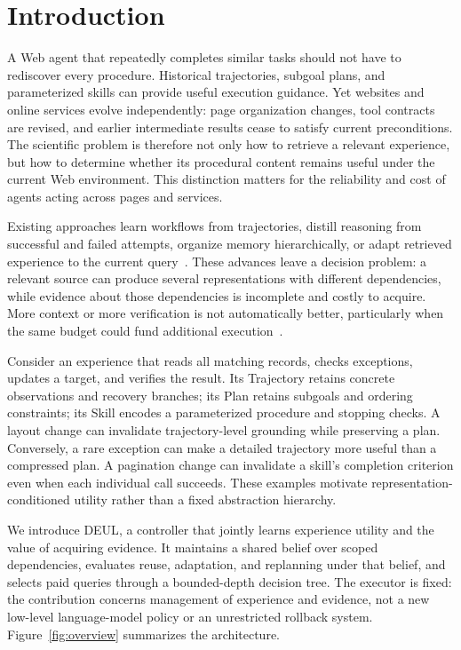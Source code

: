 \documentclass[sigconf,anonymous,review]{acmart}
\newcommand{\DEUL}{\textsc{DEUL}}
\theoremstyle{zhplain}
\begin{document}
\section{Introduction}
\label{sec:intro}
A Web agent that repeatedly completes similar tasks should not have to rediscover every procedure. Historical trajectories, subgoal plans, and parameterized skills can provide useful execution guidance. Yet websites and online services evolve independently: page organization changes, tool contracts are revised, and earlier intermediate results cease to satisfy current preconditions. The scientific problem is therefore not only how to retrieve a relevant experience, but how to determine whether its procedural content remains useful under the current Web environment. This distinction matters for the reliability and cost of agents acting across pages and services.

Existing approaches learn workflows from trajectories, distill reasoning from successful and failed attempts, organize memory hierarchically, or adapt retrieved experience to the current query~\cite{awm,reasoningbank,hepm,hmt,qcr}. These advances leave a decision problem: a relevant source can produce several representations with different dependencies, while evidence about those dependencies is incomplete and costly to acquire. More context or more verification is not automatically better, particularly when the same budget could fund additional execution~\cite{budgetstudy}.

Consider an experience that reads all matching records, checks exceptions, updates a target, and verifies the result. Its Trajectory retains concrete observations and recovery branches; its Plan retains subgoals and ordering constraints; its Skill encodes a parameterized procedure and stopping checks. A layout change can invalidate trajectory-level grounding while preserving a plan. Conversely, a rare exception can make a detailed trajectory more useful than a compressed plan. A pagination change can invalidate a skill's completion criterion even when each individual call succeeds. These examples motivate representation-conditioned utility rather than a fixed abstraction hierarchy.

We introduce \DEUL, a controller that jointly learns experience utility and the value of acquiring evidence. It maintains a shared belief over scoped dependencies, evaluates reuse, adaptation, and replanning under that belief, and selects paid queries through a bounded-depth decision tree. The executor is fixed: the contribution concerns management of experience and evidence, not a new low-level language-model policy or an unrestricted rollback system. Figure~\ref{fig:overview} summarizes the architecture.
\end{document}
